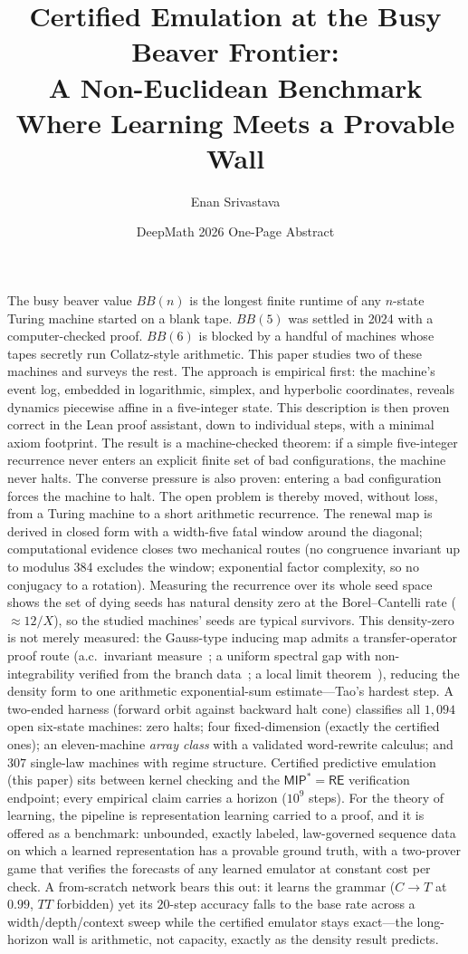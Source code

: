 \documentclass[11pt]{article}
\title{\bfseries Certified Emulation at the Busy Beaver Frontier:\\
A Non-Euclidean Benchmark Where Learning Meets a Provable Wall}
\author{Enan Srivastava}
\date{DeepMath 2026 One-Page Abstract}
\begin{document}
\maketitle

\noindent
The busy beaver value $BB(n)$ is the longest finite runtime of any
$n$-state Turing machine started on a blank tape. $BB(5)$ was settled
in 2024 with a computer-checked proof. $BB(6)$ is blocked by a handful
of machines whose tapes secretly run Collatz-style arithmetic. This paper studies two of these
machines and surveys the rest. The approach is empirical first: the
machine's event log, embedded in logarithmic, simplex, and hyperbolic
coordinates, reveals dynamics piecewise affine in a five-integer
state. This description is then proven correct in the Lean proof
assistant, down to individual steps, with a minimal axiom footprint. The result is a machine-checked
theorem: if a simple five-integer recurrence never enters an explicit
finite set of bad configurations, the machine never halts. The
converse pressure is also proven: entering a bad configuration forces the
machine to halt. The open problem is thereby moved, without loss, from
a Turing machine to a short arithmetic recurrence. The renewal map is derived in closed form with a width-five fatal
window around the diagonal; computational evidence closes two
mechanical routes (no congruence invariant up to modulus 384 excludes
the window; exponential factor complexity, so no conjugacy to a
rotation).
Measuring the recurrence over its whole seed space shows the set of
dying seeds has natural density zero at the Borel--Cantelli rate
($\approx 12/X$), so the studied machines' seeds are typical
survivors. This density-zero is not merely measured: the Gauss-type
inducing map admits a transfer-operator proof route (a.c.\ invariant
measure~\cite{rychlik}; a uniform spectral gap with non-integrability
verified from the branch data~\cite{naud,dolgopyat}; a local limit
theorem~\cite{hennion-herve,aaronson-denker}), reducing the density
form to one arithmetic exponential-sum estimate---Tao's hardest step.
A two-ended harness (forward orbit against backward halt cone)
classifies all $1{,}094$ open six-state machines: zero halts; four
fixed-dimension (exactly the certified ones); an eleven-machine
\emph{array class} with a validated word-rewrite calculus; and $307$
single-law machines with regime structure. Certified predictive emulation
(this paper) sits between kernel checking and the
$\mathsf{MIP}^{*}=\mathsf{RE}$ verification endpoint; every empirical
claim carries a horizon ($10^{9}$ steps). For the theory of
learning, the pipeline is representation learning carried to a
proof, and it is offered as a benchmark: unbounded, exactly labeled,
law-governed sequence data on which a learned representation has a
provable ground truth, with a two-prover game that verifies the
forecasts of any learned emulator at constant cost per check. A
from-scratch network bears this out: it learns the grammar
($C\!\to\!T$ at $0.99$, $TT$ forbidden) yet its $20$-step accuracy
falls to the base rate across a width/depth/context sweep while the
certified emulator stays exact---the long-horizon wall is arithmetic,
not capacity, exactly as the density result predicts.
\end{document}
